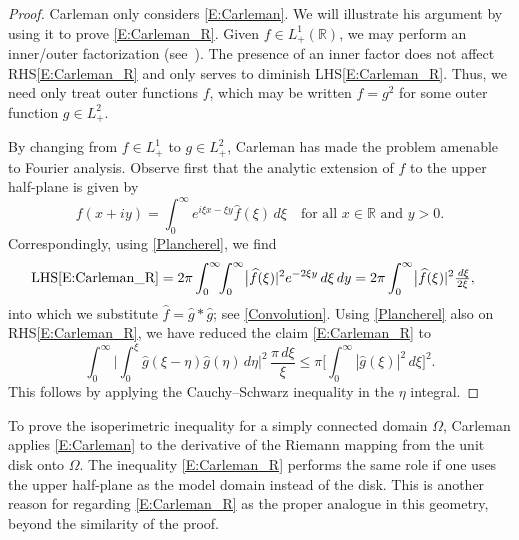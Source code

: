 \documentclass{amsart}
\numberwithin{equation}{section}
\theoremstyle{definition}
\newcommand{\R}{\mathbb{R}}
\begin{document}
\begin{proof}
Carleman only considers \eqref{E:Carleman}.  We will illustrate his argument by using it to prove \eqref{E:Carleman_R}.
Given $f\in L^1_+(\R)$, we may perform an inner/outer factorization (see~\cite{MR2261424}).  The presence of an inner factor does not affect RHS\eqref{E:Carleman_R} and only serves to diminish LHS\eqref{E:Carleman_R}. Thus, we need only treat outer functions $f$, which may be written $f=g^2$ for some outer function $g\in L^2_+$.

By changing from $f\in L^1_+$ to $g\in L^2_+$, Carleman has made the problem amenable to Fourier analysis.  Observe first that the analytic extension of $f$ to the upper half-plane is given by
\begin{equation*}
f(x+iy) = \int_0^\infty \! e^{i\xi x - \xi y} \widehat f(\xi) \, d\xi \quad\text{for all $x\in\R$ and $y>0$.} %
\end{equation*}
Correspondingly, using \eqref{Plancherel}, we find
\begin{align}
	\text{LHS\eqref{E:Carleman_R}} &= 2\pi \int_0^\infty \!\! \int_0^\infty \bigl| \widehat f (\xi)|^2 e^{-2\xi y}\,d\xi\,dy =
		2\pi \int_0^\infty \bigl| \widehat f (\xi)|^2\tfrac{\,d\xi}{2\xi},
		\label{CarlFub}
\end{align}
into which we substitute $\widehat f = \widehat g * \widehat g$; see \eqref{Convolution}.  Using \eqref{Plancherel} also on RHS\eqref{E:Carleman_R}, we have reduced the claim \eqref{E:Carleman_R} to%
\begin{equation}
	\int_0^\infty  \biggl| \int_0^\xi \widehat g(\xi-\eta) \widehat g(\eta) \, d\eta \biggr|^2\,\frac{\pi\,d\xi}{\xi}
		\leq \pi \biggl[\int_0^\infty |\widehat g(\xi)|^2\,d\xi\biggr]^2 .
\end{equation}
This follows by applying the Cauchy--Schwarz inequality in the $\eta$ integral. 
\end{proof}

To prove the isoperimetric inequality for a simply connected domain $\Omega$, Carleman applies \eqref{E:Carleman} to the derivative of the Riemann mapping from the unit disk onto $\Omega$.  The inequality \eqref{E:Carleman_R} performs the same role if one uses the upper half-plane as the model domain instead of the disk.  This is another reason for regarding \eqref{E:Carleman_R} as the proper analogue in this geometry, beyond the similarity of the proof.
\end{document}
